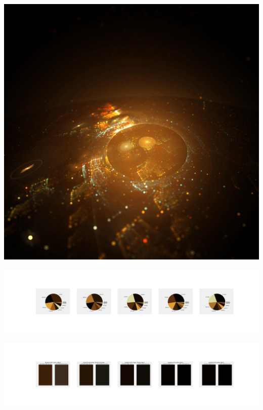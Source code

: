 \documentclass[11pt]{article}
\begin{document}
\begin{landscape}
    \begin{center}
    \includegraphics[width=\textwidth]{./nbimg/file (87).jpg}
    \end{center}

    \begin{center}
    \includegraphics[width=250mm]{./nbimg/pie-437.jpg}
    \end{center}

    \begin{center}
    \includegraphics[width=250mm]{./nbimg/peak-437.jpg}
    \end{center}
    


\end{landscape}
\end{document}
